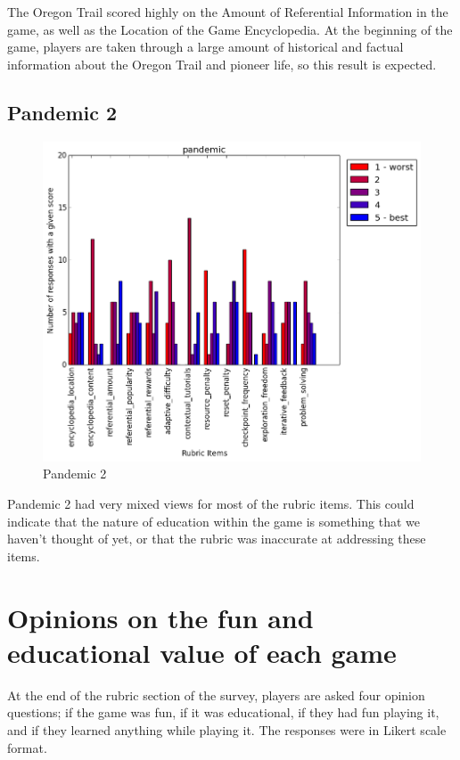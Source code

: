 				The Oregon Trail scored highly on the Amount of Referential Information in the game, as well as the Location of the Game Encyclopedia. At the beginning of the game, players are taken through a large amount of historical and factual information about the Oregon Trail and pioneer life, so this result is expected.

			\subsection{Pandemic 2}

				\begin{figure}[] 
				\centering 
				\includegraphics[width=\textwidth, height=.4\textheight, keepaspectratio=true]{pandemic_scores.png} 
				\caption{Pandemic 2}
				\end{figure}

				Pandemic 2 had very mixed views for most of the rubric items. This could indicate that the nature of education within the game is something that we haven't thought of yet, or that the rubric was inaccurate at addressing these items.

			\clearpage

		\section{Opinions on the fun and educational value of each game}

			At the end of the rubric section of the survey, players are asked four opinion questions; if the game was fun, if it was educational, if they had fun playing it, and if they learned anything while playing it. The responses were in Likert scale format.

